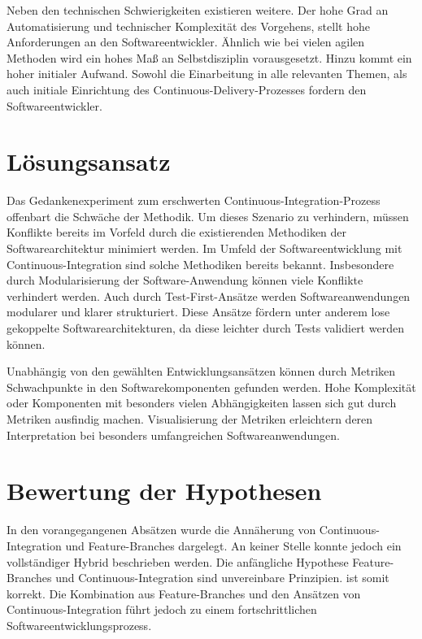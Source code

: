 Neben den technischen Schwierigkeiten existieren weitere. Der hohe Grad an Automatisierung und technischer Komplexität des Vorgehens, stellt hohe Anforderungen an den Softwareentwickler. Ähnlich wie bei vielen agilen Methoden wird ein hohes Maß an Selbstdisziplin vorausgesetzt. Hinzu kommt ein hoher initialer Aufwand. Sowohl die Einarbeitung in alle relevanten Themen, als auch initiale Einrichtung des Continuous-Delivery-Prozesses fordern den Softwareentwickler.

\section{Lösungsansatz}

Das Gedankenexperiment zum erschwerten Continuous-Integration-Prozess offenbart die Schwäche der Methodik. Um dieses Szenario zu verhindern, müssen Konflikte bereits im Vorfeld durch die existierenden Methodiken der Softwarearchitektur minimiert werden. Im Umfeld der Softwareentwicklung mit Continuous-Integration sind solche Methodiken bereits bekannt. Insbesondere durch Modularisierung der Software-Anwendung können viele Konflikte verhindert werden. Auch durch Test-First-Ansätze werden Softwareanwendungen modularer und klarer strukturiert. Diese Ansätze fördern unter anderem \glqq lose gekoppelte\grqq{}  Softwarearchitekturen, da diese leichter durch Tests validiert werden können. 

Unabhängig von den gewählten Entwicklungsansätzen können durch Metriken\\ Schwachpunkte in den Softwarekomponenten gefunden werden. Hohe Komplexität oder Komponenten mit besonders vielen Abhängigkeiten lassen sich gut durch Metriken ausfindig machen. Visualisierung der Metriken erleichtern deren Interpretation bei besonders umfangreichen Softwareanwendungen. 

\section{Bewertung der Hypothesen}

In den vorangegangenen Absätzen wurde die Annäherung von Continuous-Integration und Feature-Branches dargelegt. An keiner Stelle konnte jedoch ein vollständiger Hybrid beschrieben werden. Die anfängliche Hypothese \glqq Feature-Branches und Continuous-Integration sind unvereinbare Prinzipien.\grqq{} ist somit korrekt. Die Kombination aus Feature-Branches und den Ansätzen von Continuous-Integration führt jedoch zu einem fortschrittlichen Softwareentwicklungsprozess.


